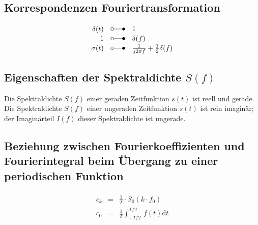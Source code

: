 \subsection{Korrespondenzen Fouriertransformation}
\begin{align*}
\begin{array}{rcl}
\delta(t) & \laplace & 1\\
1 & \laplace & \delta(f)\\
\sigma(t) & \laplace & \frac{1}{j 2 \pi f} + \frac{1}{2} \delta(f)\\
\end{array}
\end{align*}

\subsection{Eigenschaften der Spektraldichte $S(f)$}
$\mbox{}$\\
Die Spektraldichte $S(f)$ einer geraden Zeitfunktion $s(t)$ ist reell und gerade.\\
Die Spektraldichte $S(f)$ einer ungeraden Zeitfunktion $s(t)$ ist rein imaginär; der Imaginärteil $I(f)$ dieser Spektraldichte ist ungerade.
$\mbox{}$\\

\subsection[Fourierkoeffizienten, Fourierintegral, periodische Funktion]{Beziehung zwischen Fourierkoeffizienten und Fourierintegral beim Übergang zu einer periodischen Funktion}
\begin{align*}
\begin{array}{rcl}
c_k & = & \frac{1}{T} \cdot S_0(k \cdot f_0)\\
	c_0 & = & \frac{1}{T} \int_{-T/2}^{T/2} \, f(t) \mathrm{d}t
\end{array}
\end{align*}
